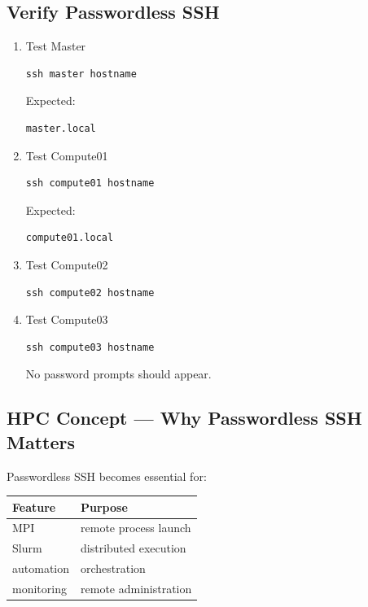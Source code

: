 \documentclass[11pt]{article}
\begin{document}
\subsection{Verify Passwordless SSH}
\label{sec:orgceb047c}
\begin{enumerate}
\item Test Master
\label{sec:org60ced9b}

\begin{verbatim}
ssh master hostname
\end{verbatim}

Expected:

\begin{verbatim}
master.local
\end{verbatim}
\item Test Compute01
\label{sec:orgf326b4d}

\begin{verbatim}
ssh compute01 hostname
\end{verbatim}

Expected:

\begin{verbatim}
compute01.local
\end{verbatim}
\item Test Compute02
\label{sec:orge4ff429}

\begin{verbatim}
ssh compute02 hostname
\end{verbatim}
\item Test Compute03
\label{sec:orgae21010}

\begin{verbatim}
ssh compute03 hostname
\end{verbatim}

No password prompts should appear.
\end{enumerate}
\subsection{HPC Concept — Why Passwordless SSH Matters}
\label{sec:org2af335d}

Passwordless SSH becomes essential for:

\begin{center}
\begin{tabular}{ll}
Feature & Purpose\\
\hline
MPI & remote process launch\\
Slurm & distributed execution\\
automation & orchestration\\
monitoring & remote administration\\
\end{tabular}
\end{center}
\end{document}

